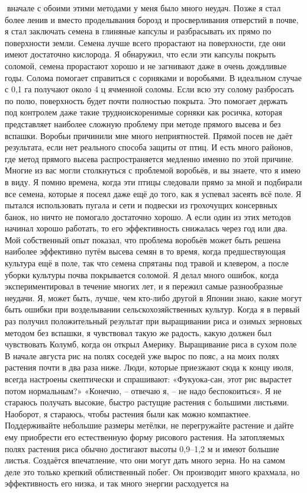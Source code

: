 \documentclass[a4paper]{book}
\begin{document}
вначале с обоими этими методами у меня было много неудач.
Позже я стал более ленив и вместо проделывания борозд и просверливания отверстий в
почве, я стал заключать семена в глиняные капсулы и разбрасывать их прямо по поверхности
земли. Семена лучше всего прорастают на поверхности, где они имеют достаточно
кислорода. Я обнаружил, что если эти капсулы покрыть соломой, семена прорастают хорошо
и не загнивают даже в очень дождливые годы.
Солома помогает справиться с сорняками и воробьями.
В идеальном случае с 0,1 га получают около 4 ц ячменной соломы. Если всю эту солому
разбросать по полю, поверхность будет почти полностью покрыта. Это помогает держать
под контролем даже такие трудноискоренимые сорняки как росичка, которая представляет
наиболее сложную проблему при методе прямого высева и без вспашки.
Воробьи причинили мне много неприятностей. Прямой посев не даёт результата, если
нет реального способа защиты от птиц. И есть много районов, где метод прямого высева
распространяется медленно именно по этой причине. Многие из вас могли столкнуться с
проблемой воробьёв, и вы знаете, что я имею в виду.
Я помню времена, когда эти птицы следовали прямо за мной и подбирали все семена,
которые я посеял даже ещё до того, как я успевал засеять всё поле. Я пытался использовать
пугала и сети и подвески из грохочущих консервных банок, но ничто не помогало достаточно
хорошо. А если один из этих методов начинал хорошо работать, то его эффективность
снижалась через год или два. Мой собственный опыт показал, что проблема воробьёв может
быть решена наиболее эффективно путём высева семян в то время, когда предшествующая
культура ещё в поле, так что семена спрятаны под травой и клевером, а после уборки
культуры почва покрывается соломой.
Я делал много ошибок, когда экспериментировал в течение многих лет, и я пережил
самые разнообразные неудачи. Я, может быть, лучше, чем кто-либо другой в Японии знаю,
какие могут быть ошибки при возделывании сельскохозяйственных культур. Когда я в первый
раз получил положительный результат при выращивании риса и озимых зерновых методом
без вспашки, я чувствовал такую же радость, какую должен был чувствовать Колумб, когда
он открыл Америку.
Выращивание риса в сухом поле
В начале августа рис на полях соседей уже вырос по пояс, а на моих полях растения
почти в два раза ниже. Люди, которые приезжают сюда к концу июля, всегда настроены
скептически и спрашивают:
«Фукуока-сан, этот рис вырастет потом нормальным?» «Конечно, – отвечаю я, – не надо
беспокоиться».
Я не стараюсь получать высокие, быстро растущие растения с большими листьями.
Наоборот, я стараюсь, чтобы растения были как можно компактнее. Поддерживайте
небольшие размеры метёлки, не перегружайте растение и дайте ему приобрести его
естественную форму рисового растения. На затопляемых полях растения риса обычно
достигают высоты 0,9–1,2 м и имеют большие листья. Создаётся впечатление, что они могут
дать много зерна. Но на самом деле это только крепкий облиственный побег. Он производит
много крахмала, но эффективность его низка, и так много энергии расходуется на
\end{document}

